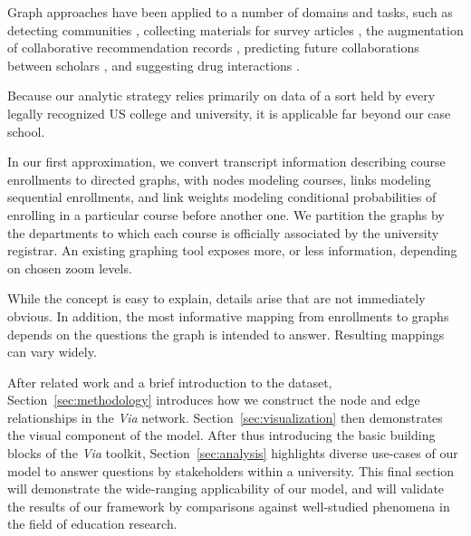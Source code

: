 Graph approaches have been applied to a number of
domains and tasks, such as detecting communities
\cite{Fortunato2004}, collecting materials for survey articles
\cite{ji2015}, the augmentation of collaborative recommendation
records \cite{huang2005}, predicting future collaborations between
scholars \cite{liben2007}, and suggesting drug interactions
\cite{zitnik2018}.

Because our analytic strategy relies primarily on data of a sort held by every legally recognized US college and university, it is applicable far beyond our case school. 


In our first approximation, we convert transcript information describing course enrollments to directed graphs, with nodes modeling courses, links modeling sequential enrollments, and link weights modeling conditional probabilities of enrolling in a particular course before another one. We partition the graphs by the departments to which each course is officially associated by the university registrar. An existing graphing tool \cite{shannon2003cytoscape} exposes more, or less information, depending on chosen zoom levels.

While the concept is easy to explain, details arise that are not
immediately obvious. In addition, the most informative mapping from
enrollments to graphs depends on the questions the graph is intended
to answer. Resulting mappings can vary widely.


After related work and a brief introduction to the dataset,
Section~\ref{sec:methodology} introduces how we construct the node and
edge relationships in the {\em Via}
network. Section~\ref{sec:visualization} then demonstrates the visual
component of the model. After thus introducing the basic building blocks of
the {\em Via} toolkit, Section~\ref{sec:analysis} highlights diverse use-cases of our model to answer questions by stakeholders within a university. This final section will demonstrate the wide-ranging applicability of our model, and will validate the results of our framework by comparisons against well-studied phenomena in the field of education research.


